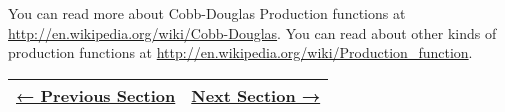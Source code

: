 You can read more about Cobb-Douglas Production functions at
\url{http://en.wikipedia.org/wiki/Cobb-Douglas}. You can read about
other kinds of production functions at
\url{http://en.wikipedia.org/wiki/Production_function}.

\begin{longtable}[]{@{}ll@{}}
\toprule
\endhead
\href{../chapter3/section3-8.php}{← Previous Section} &
\href{section4-2.php}{Next Section →}\tabularnewline
\bottomrule
\end{longtable}

